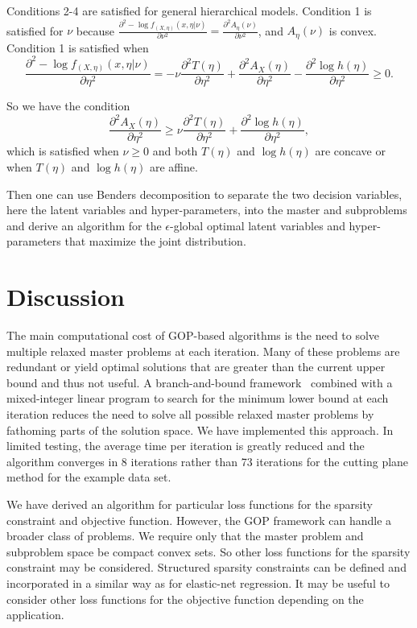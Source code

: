 \documentclass{article} %
\renewcommand{\geq}{\geqslant}
\begin{document}
Conditions 2-4 are satisfied for general hierarchical models. Condition 1 is satisfied for $\nu$ because $\frac{\partial^2 - \log f_{(X,\eta)}(x,\eta | \nu)}{\partial \nu^2} = \frac{\partial^2 A_\eta(\nu)}{\partial \nu^2}$, and $A_\eta(\nu)$ is convex. Condition 1 is satisfied when
\begin{equation}
	\frac{\partial^2 - \log f_{(X,\eta)}(x,\eta | \nu)}{\partial \eta^2} = -\nu \frac{\partial^2 T(\eta)}{\partial \eta^2} + \frac{\partial^2 A_X(\eta)}{\partial \eta^2} - \frac{\partial^2 \log h(\eta)}{\partial \eta^2} \geq 0.
\end{equation}

So we have the condition
\begin{equation}
	\frac{\partial^2 A_X(\eta)}{\partial \eta^2} \geq \nu \frac{\partial^2 T(\eta)}{\partial \eta^2} + \frac{\partial^2 \log h(\eta)}{\partial \eta^2},
\end{equation}
which is satisfied when $\nu \geq 0$ and both $T(\eta)$ and $\log
h(\eta)$ are concave or when $T(\eta)$ and $\log h(\eta)$ are affine.


Then one can use Benders decomposition to separate the two
decision variables, here the latent variables and
hyper-parameters, into the master and subproblems
and derive an algorithm for the $\epsilon$-global optimal latent
variables and hyper-parameters that maximize the joint distribution.

\section{Discussion}

The main computational cost of GOP-based algorithms is the need to solve
multiple relaxed master problems at each iteration. Many of these problems are
redundant or yield optimal solutions that are greater than the current upper
bound and thus not useful. A branch-and-bound framework~\cite{Floudas1994}
combined with a mixed-integer linear program to search for the minimum lower
bound at each iteration reduces the need to solve all possible relaxed master
problems by fathoming parts of the solution space. We have implemented this
approach. In limited testing, the average time per iteration is greatly reduced
and the algorithm converges in 8 iterations rather than 73 iterations for the
cutting plane method for the example data set.

We have derived an algorithm for particular loss functions for the sparsity
constraint and objective function. However, the GOP framework can handle a
broader class of problems. We require only that the master problem and
subproblem space be compact convex sets. So other loss functions for the
sparsity constraint may be considered. Structured sparsity constraints can be
defined and incorporated in a similar way as for elastic-net regression. It may
be useful to consider other loss functions for the objective function depending
on the application.
\end{document}
